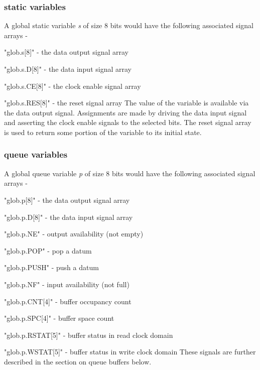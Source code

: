             \subsubsection{static variables}

                A global static variable {\em s} of size 8 bits would have
                the following associated signal arrays -
                \blist
                \item   "glob.s[8]" - the data output signal array
                \item   "glob.s.D[8]" - the data input signal array
                \item   "glob.s.CE[8]" - the clock enable signal array
                \item   "glob.s.RES[8]" - the reset signal array
                \blend                
                The value of the variable is available via the data output
                signal. Assignments are made by driving the data input
                signal and asserting the clock enable signals to the selected
                bits. The reset signal array is used to return some
                portion of the variable to its initial state.

            \subsubsection{queue variables}

                A global queue variable {\em p} of size 8 bits would have
                the following associated signal arrays -
                \blist
                \item   "glob.p[8]" - the data output signal array
                \item   "glob.p.D[8]" - the data input signal array
                \item   "glob.p.NE" - output availability (not empty)
                \item   "glob.p.POP" - pop a datum
                \item   "glob.p.PUSH" - push a datum
                \item   "glob.p.NF" - input availability (not full)
                \item   "glob.p.CNT[4]" - buffer occupancy count
                \item   "glob.p.SPC[4]" - buffer space count
                \item   "glob.p.RSTAT[5]" - buffer status in read clock domain
                \item   "glob.p.WSTAT[5]" - buffer status in write clock domain
                \blend
                These signals are further described in the section on queue
                buffers below.

